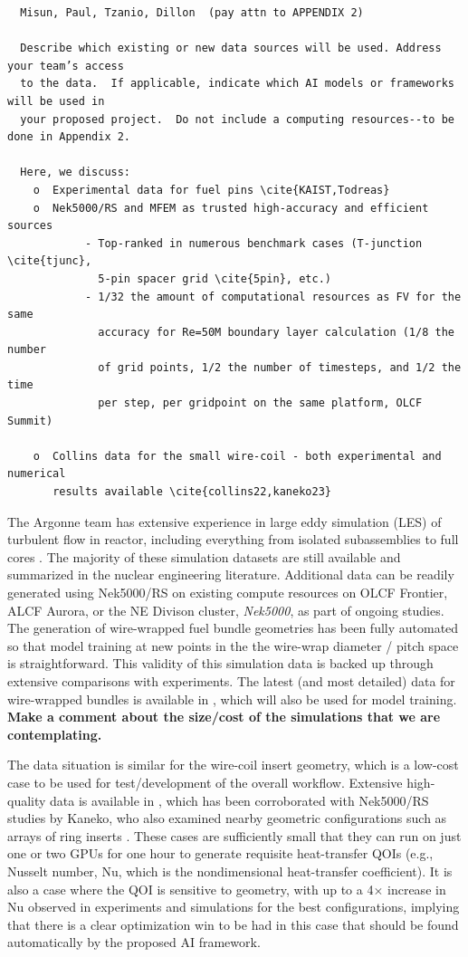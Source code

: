 \tiny \small \begin{verbatim}
  Misun, Paul, Tzanio, Dillon  (pay attn to APPENDIX 2)

  Describe which existing or new data sources will be used. Address your team’s access
  to the data.  If applicable, indicate which AI models or frameworks will be used in
  your proposed project.  Do not include a computing resources--to be done in Appendix 2.

  Here, we discuss:
    o  Experimental data for fuel pins \cite{KAIST,Todreas}
    o  Nek5000/RS and MFEM as trusted high-accuracy and efficient sources
            - Top-ranked in numerous benchmark cases (T-junction \cite{tjunc},
              5-pin spacer grid \cite{5pin}, etc.)
            - 1/32 the amount of computational resources as FV for the same
              accuracy for Re=50M boundary layer calculation (1/8 the number
              of grid points, 1/2 the number of timesteps, and 1/2 the time
              per step, per gridpoint on the same platform, OLCF Summit)

    o  Collins data for the small wire-coil - both experimental and numerical
       results available \cite{collins22,kaneko23}
\end{verbatim}
\normalsize

The Argonne team has extensive experience in large eddy simulation (LES) of
turbulent flow in reactor, including everything from isolated subassemblies
\cite{fischer08a,Dai2025WireWrapped61Pin,other} to full cores \cite{sc22,gb23,other3}.
The majority of these simulation datasets are still available and summarized in
the nuclear engineering literature.  Additional data can be readily generated
using Nek5000/RS on existing compute resources on OLCF Frontier, ALCF Aurora,
or the NE Divison cluster, {\em Nek5000}, as part of ongoing studies.  The
generation of wire-wrapped fuel bundle geometries has been fully automated so
that model training at new points in the the wire-wrap diameter / pitch space
is straightforward.  This validity of this simulation data is backed up through
extensive comparisons with experiments.  The latest (and most detailed) data
for wire-wrapped bundles is available in \cite{kaeri37pin}, which will also be
used for model training. {\bf Make a comment about the size/cost of the
simulations that we are contemplating.}

The data situation is similar for the wire-coil insert geometry, which is a
low-cost case to be used for test/development of the overall workflow.
Extensive high-quality data is available in \cite{collins22}, which has been
corroborated with Nek5000/RS studies by Kaneko, who also examined nearby
geometric configurations such as arrays of ring inserts \cite{kaneko22}.
These cases are sufficiently small that they can run on just one or two
GPUs for one hour to generate requisite heat-transfer QOIs (e.g., Nusselt
number, Nu, which is the nondimensional heat-transfer coefficient).
It is also a case where the QOI is sensitive to geometry, with up to a
4$\times$ increase in Nu observed in experiments and simulations for
the best configurations, implying that there is a clear optimization win
to be had in this case that should be found automatically by the proposed
AI framework.

